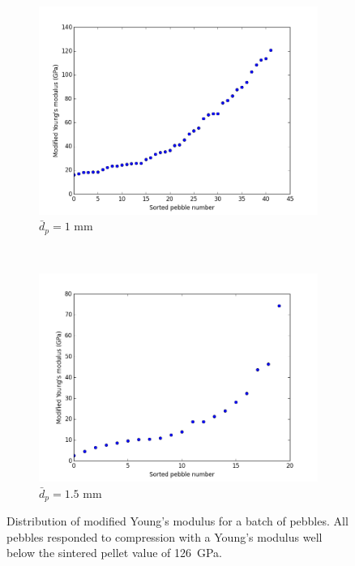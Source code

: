 \begin{figure}
        \centering
        \begin{subfigure}[b]{\imagewidth}
                \includegraphics[width=\textwidth]{chapters/figures/nfri-1mm-E-plot.png}
                \caption{$\bar{d}_p = 1$ mm}
                \label{fig:nfri-1mm-E-plot}
        \end{subfigure}
        ~
        \begin{subfigure}[b]{\imagewidth}
                \includegraphics[width=\textwidth]{chapters/figures/nfri-1.5mm-E-plot.png}
                \caption{$\bar{d}_p = 1.5$ mm}
                \label{fig:nfri-1.5mm-E-plot}
        \end{subfigure}
        \caption{Distribution of modified Young's modulus for a batch of \lit pebbles. All pebbles responded to compression with a Young's modulus well below the sintered pellet value of \si{126 GPa}.}\label{fig:nfri-E-plot}
\end{figure}


